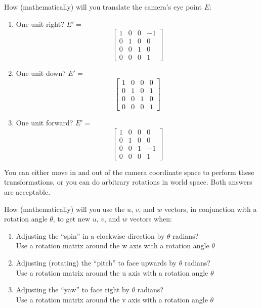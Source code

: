 \documentclass[10pt,twocolumn]{article}
\begin{document}
\begin{framed}
\noindent {\bf [1/2 pt. each]} How (mathematically) will you translate the camera's eye point $E$:
\begin{enumerate}
\item One unit right? $E' = $\\
 $$
	\begin{bmatrix}
	1 & 0 & 0 & -1 \\
	0 & 1 & 0 & 0 \\
	0 & 0 & 1 & 0 \\
	0 & 0 & 0 & 1
	\end{bmatrix}
 $$


\item One unit down? $E' = $\\
 $$
	\begin{bmatrix}
	1 & 0 & 0 & 0 \\
	0 & 1 & 0 & 1 \\
	0 & 0 & 1 & 0 \\
	0 & 0 & 0 & 1
	\end{bmatrix}
 $$

\item One unit forward? $E' = $\\
 $$
	\begin{bmatrix}
	1 & 0 & 0 & 0 \\
	0 & 1 & 0 & 0 \\
	0 & 0 & 1 & -1 \\
	0 & 0 & 0 & 1
	\end{bmatrix}
 $$

\end{enumerate}
\end{framed}

\noindent You can either move in and out of the camera coordinate space to perform these transformations, or you can do arbitrary rotations in world space. Both answers are acceptable.

\begin{framed}
\noindent {\bf [1/2 pt. each]} How (mathematically) will you use the $u$, $v$, and $w$ vectors, in conjunction with a rotation angle $\theta$, to get new $u$, $v$, and $w$ vectors when:
\begin{enumerate}
\item Adjusting the ``spin'' in a clockwise direction by $\theta$ radians?\\
Use a rotation matrix around the w axis with a rotation angle $\theta$

\item Adjusting (rotating) the ``pitch'' to face upwards by $\theta$ radians?\\
Use a rotation matrix around the u axis with a rotation angle $\theta$

\item Adjusting the ``yaw'' to face right by $\theta$ radians?\\
Use a rotation matrix around the v axis with a rotation angle $\theta$
\end{enumerate}
\end{framed}
\end{document}
